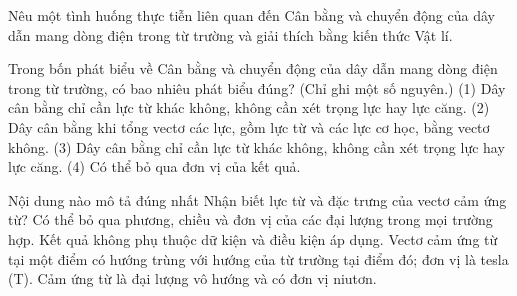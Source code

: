 \begin{bt}
Nêu một tình huống thực tiễn liên quan đến Cân bằng và chuyển động của dây dẫn mang dòng điện trong từ trường và giải thích bằng kiến thức Vật lí.
\end{bt}

\begin{ex}
Trong bốn phát biểu về Cân bằng và chuyển động của dây dẫn mang dòng điện trong từ trường, có bao nhiêu phát biểu đúng? (Chỉ ghi một số nguyên.) (1) Dây cân bằng chỉ cần lực từ khác không, không cần xét trọng lực hay lực căng. (2) Dây cân bằng khi tổng vectơ các lực, gồm lực từ và các lực cơ học, bằng vectơ không. (3) Dây cân bằng chỉ cần lực từ khác không, không cần xét trọng lực hay lực căng. (4) Có thể bỏ qua đơn vị của kết quả.
\end{ex}

\begin{ex}
Nội dung nào mô tả đúng nhất Nhận biết lực từ và đặc trưng của vectơ cảm ứng từ?
\choice
{Có thể bỏ qua phương, chiều và đơn vị của các đại lượng trong mọi trường hợp.}
{Kết quả không phụ thuộc dữ kiện và điều kiện áp dụng.}
{\True Vectơ cảm ứng từ tại một điểm có hướng trùng với hướng của từ trường tại điểm đó; đơn vị là tesla (T).}
{Cảm ứng từ là đại lượng vô hướng và có đơn vị niutơn.}
\end{ex}

